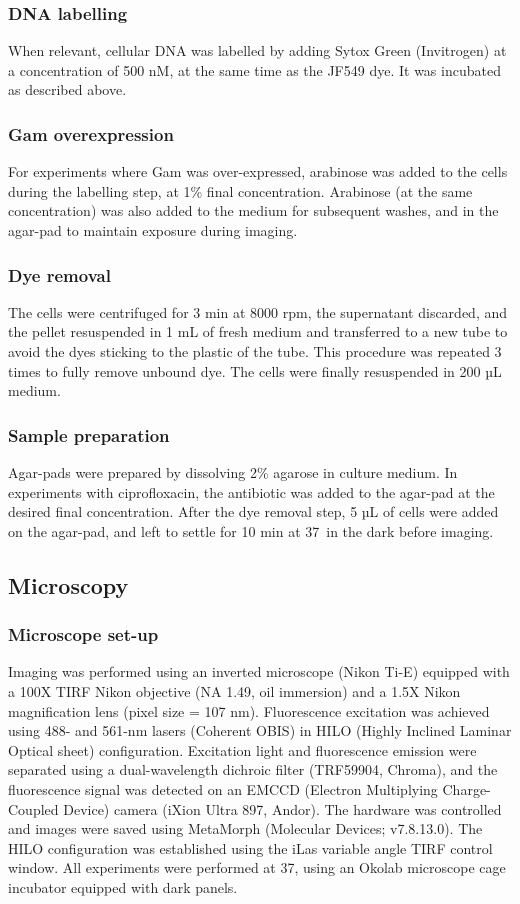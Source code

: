 \subsubsection*{DNA labelling}
When relevant, cellular DNA was labelled by adding Sytox Green (Invitrogen) at a concentration of 500 nM, at the same time as the JF549 dye. It was incubated as described above.
\subsubsection*{Gam overexpression}
For experiments where Gam was over-expressed, arabinose was added to the cells during the labelling step, at 1\% final concentration. Arabinose (at the same concentration) was also added to the medium for subsequent washes, and in the agar-pad to maintain exposure during imaging.
\subsubsection*{Dye removal}
The cells were centrifuged for 3 min at 8000 rpm, the supernatant discarded, and the pellet resuspended in 1 mL of fresh medium and transferred to a new tube to avoid the dyes sticking to the plastic of the tube. This procedure was repeated 3 times to fully remove unbound dye. The cells were finally resuspended in 200 µL medium.
\subsubsection*{Sample preparation}
Agar-pads were prepared by dissolving 2\% agarose in culture medium. In experiments with ciprofloxacin, the antibiotic was added to the agar-pad at the desired final concentration. After the dye removal step, 5 µL of cells were added on the agar-pad, and left to settle for 10 min at 37\celsius\ in the dark before imaging.

\subsection*{Microscopy}
\subsubsection*{Microscope set-up}
Imaging was performed using an inverted microscope (Nikon Ti-E) equipped with a 100X TIRF Nikon objective (NA 1.49, oil immersion) and a 1.5X Nikon magnification lens (pixel size = 107 nm). Fluorescence excitation was achieved using 488- and 561-nm lasers (Coherent OBIS) in HILO (Highly Inclined Laminar Optical sheet) configuration. Excitation light and fluorescence emission were separated using a dual-wavelength dichroic filter (TRF59904, Chroma), and the fluorescence signal was detected on an EMCCD (Electron Multiplying Charge-Coupled Device) camera (iXion Ultra 897, Andor). The hardware was controlled and images were saved using MetaMorph (Molecular Devices; v7.8.13.0). The HILO configuration was established using the iLas variable angle TIRF control window. All experiments were performed at 37\celsius, using an Okolab microscope cage incubator equipped with dark panels.

